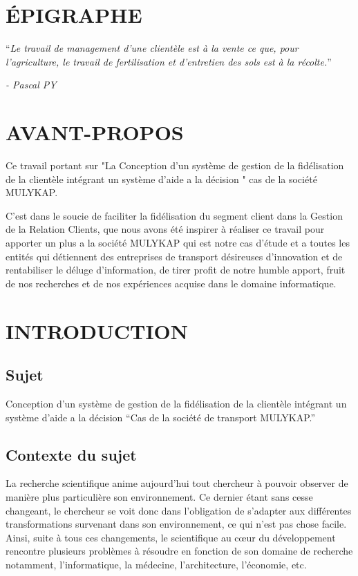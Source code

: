 \documentclass[a4paper,12pt,oneside]{book}
\begin{document}
\frontmatter
    \chapter*{ÉPIGRAPHE}
    \enquote{\it Le travail de management d’une clientèle est à la vente ce
    que, pour l’agriculture, le travail de fertilisation et
    d’entretien des sols est à la récolte.}
    \begin{flushright}
        \it - Pascal PY
    \end{flushright}
    
    \chapter*{AVANT-PROPOS}
    Ce travail portant sur "La Conception d’un système de gestion de la fidélisation
    de la clientèle intégrant un système d’aide a la décision
    " cas de la société MULYKAP.
    \newline

    C’est dans le soucie de faciliter la fidélisation du segment client
    dans la Gestion de la Relation Clients, que nous avons été inspirer
    à réaliser ce travail pour apporter un plus a la société MULYKAP
    qui est notre cas d’étude et a toutes les entités qui détiennent des entreprises
    de transport désireuses d’innovation et de rentabiliser le 
    déluge d’information, de tirer profit de notre humble apport, fruit
    de nos recherches et de nos expériences acquise dans le domaine informatique.

\mainmatter

    \chapter*{INTRODUCTION}
        \section[Sujet]{Sujet}
        Conception d’un système de gestion de la fidélisation
        de la clientèle intégrant un système d’aide a la décision \enquote{Cas de la société de transport MULYKAP.}
        \section[Contexte du sujet]{Contexte du sujet}
        La recherche scientifique anime aujourd’hui tout chercheur
        à pouvoir observer de manière
        plus particulière son environnement. Ce dernier étant
        sans cesse changeant, le chercheur se voit donc
        dans l’obligation de s’adapter aux différentes transformations
        survenant dans son environnement, ce qui n’est pas chose facile.
        Ainsi, suite à tous ces changements, le scientifique au cœur du
        développement rencontre plusieurs problèmes à résoudre en
        fonction de son domaine de recherche notamment, l’informatique,
        la médecine, l’architecture, l’économie, etc.
        \newline
\end{document}
